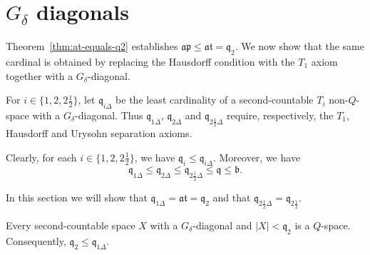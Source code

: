 \section{$G_\delta$ diagonals}
\label{sec:small-diagonals}

Theorem~\ref{thm:at-equals-q2} establishes
$\mathfrak{ap}\leq\mathfrak{at}=\mathfrak q_2$.
We now show that the same cardinal is obtained by replacing the Hausdorff
condition with the $T_1$ axiom together with a $G_\delta$-diagonal.

\begin{definition}\label{def:q-diagonal-variants}
For $i\in\{1,2,2\frac{1}{2}\}$, let $\mathfrak q_{i\Delta}$ be the least
cardinality of a second-countable $T_i$ non-$Q$-space with a
$G_\delta$-diagonal. Thus $\mathfrak q_{1\Delta}$,
$\mathfrak q_{2\Delta}$ and $\mathfrak q_{2\frac{1}{2}\Delta}$ require,
respectively, the $T_1$, Hausdorff and Urysohn separation axioms.
\end{definition}

Clearly, for each $i\in\{1,2,2\frac{1}{2}\}$, we have $\mathfrak q_i\leq\mathfrak q_{i\Delta}$.
Moreover, we have
\[
  \mathfrak q_{1\Delta}\leq\mathfrak q_{2\Delta}
  \leq\mathfrak q_{2\frac{1}{2}\Delta}\leq\mathfrak q\leq\mathfrak b.
\]

In this section we will show that $\mathfrak q_{1\Delta}=\mathfrak{at}=\mathfrak q_2$ and that $\mathfrak q_{2\frac{1}{2}\Delta}=\mathfrak q_{2\frac{1}{2}}$.

\begin{lemma}\label{lem:q2-leq-q1delta}
Every second-countable space $X$ with a $G_\delta$-diagonal and
$|X|<\mathfrak q_2$ is a $Q$-space. Consequently,
$\mathfrak q_2\leq\mathfrak q_{1\Delta}$.
\end{lemma}

